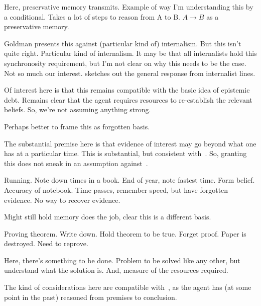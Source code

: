 \begin{note}
  Here, preservative memory transmits.
  Example of way I'm understanding this by a conditional.
  Takes a lot of steps to reason from A to B.
  \(A \rightarrow B\) as a preservative memory.

  Goldman presents this against (particular kind of) internalism.
  But this isn't quite right.
  Particular kind of internalism.
  It may be that all internalists hold this synchronosity requirement, but I'm not clear on why this needs to be the case.
  Not so much our interest.
  \cite{Korcz:2019tl} sketches out the general response from internalist lines.

  Of interest here is that this remains compatible with the basic idea of epistemic debt.
  Remains clear that the agent requires resources to re-establish the relevant beliefs.
  So, we're not assuming anything strong.

  Perhaps better to frame this as forgotten basis.
\end{note}

\begin{note}
  The substantial premise here is that evidence of interest may go beyond what one has at a particular time.
  This is substantial, but consistent with~\ESU{}.
  So, granting this does not sneak in an assumption against~\ESU{}.
\end{note}

\begin{note}
  Running.
  Note down times in a book.
  End of year, note fastest time.
  Form belief.
  Accuracy of notebook.
  Time passes, remember speed, but have forgotten evidence.
  No way to recover evidence.

  Might still hold memory does the job, clear this is a different basis.
\end{note}

\begin{note}
  Proving theorem.
  Write down.
  Hold theorem to be true.
  Forget proof.
  Paper is destroyed.
  Need to reprove.

  Here, there's something to be done.
  Problem to be solved like any other, but understand what the solution is.
  And, measure of the resources required.
\end{note}

\begin{note}[~\ESU{}]
  The kind of considerations here are compatible with~\ESU{}, as the agent has (at some point in the past) reasoned from premises to conclusion.
\end{note}

